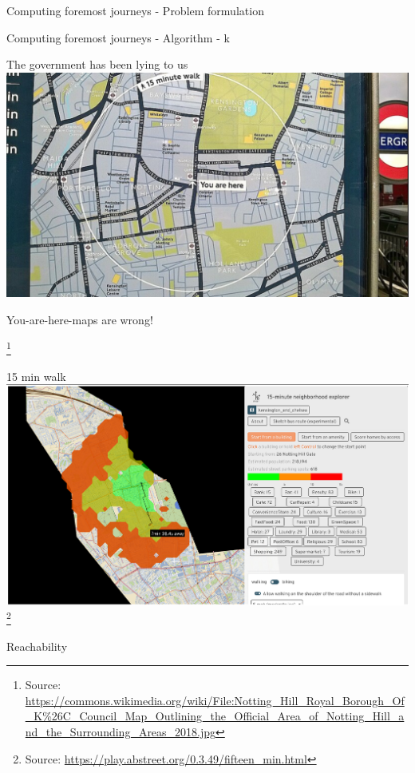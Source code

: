 \documentclass{beamer}
\newcommand{\sourcefootnote}[1]{\let\thefootnote\relax\footnote{{\tiny Source: \url{#1}}}}
\begin{document}
\begin{frame}{Computing foremost journeys - Problem formulation}

\end{frame}
\begin{frame}{Computing foremost journeys - Algorithm}
  - k

\end{frame}


\begin{frame}{The government has been lying to us}
  \includegraphics[width=0.9\linewidth]{media/image_1737738340.png}
  \caption{You-are-here-maps are wrong!}
\sourcefootnote{https://commons.wikimedia.org/wiki/File:Notting_Hill_Royal_Borough_Of_K\%26C_Council_Map_Outlining_the_Official_Area_of_Notting_Hill_and_the_Surrounding_Areas_2018.jpg}
\end{frame}

\begin{frame}{15 min walk}
  \includegraphics[width=\linewidth]{media/15-min-walk.png}
  \sourcefootnote{https://play.abstreet.org/0.3.49/fifteen_min.html}
\end{frame}

\begin{frame}{Reachability}
  \begin{tcolorbox}[definitionstyle, title=Definition: Reachability]
  \end{tcolorbox}

\end{frame}
\end{document}
